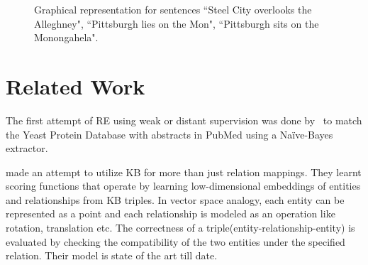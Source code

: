 \documentclass[11pt,a4paper]{article}
\begin{document}
\begin{figure}
  \caption{Graphical representation for sentences ``Steel City overlooks the
    Alleghney", ``Pittsburgh lies on the Mon", ``Pittsburgh sits on the
    Monongahela".}
  \label{fig:M1}
\end{figure}

\section{Related Work}

The first attempt of RE using weak or distant supervision was done
by~\cite{craven-1999-biological-kbs} to match the Yeast Protein Database with
abstracts in PubMed using a Naïve-Bayes extractor.

\cite{weston-2013-connecting-language-and-kb} made an attempt to utilize KB for
more than just relation mappings. They learnt scoring functions that operate by
learning low-dimensional embeddings of entities and relationships from KB
triples. In vector space analogy, each entity can be represented as a point and
each relationship is modeled as an operation like rotation, translation etc.
The correctness of a triple(entity-relationship-entity) is evaluated by
checking the compatibility of the two entities under the specified relation.
Their model is state of the art till date.
\end{document}
